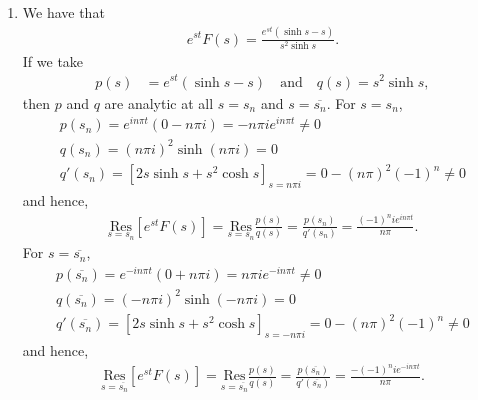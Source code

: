 \documentclass[a4paper,12pt]{article}
\begin{document}
\begin{enumerate}
\begin{enumerate}
            \item
                We have that
                \begin{align*}
                    e^{st} F(s) = \frac{e^{st}(\sinh s - s)}{s^2 \sinh s}.
                \end{align*}
                If we take
                \begin{align*}
                    p(s) &= e^{st}(\sinh s - s) \quad \text{and} \quad
                    q(s) = s^2 \sinh s,
                \end{align*}
                then $p$ and $q$ are analytic at all $s = s_n$ and $s = \overline{s_n}$. For $s = s_n$,
                \begin{gather*}
                    p(s_n) = e^{in\pi t}(0 - n\pi i) = -n\pi i e^{in\pi t} \neq 0 \\
                    q(s_n) = (n\pi i)^2 \sinh(n\pi i) = 0 \\
                    q'(s_n) = [2s \sinh s + s^2 \cosh s]_{s = n\pi i} = 0 - (n\pi)^2(-1)^n \neq 0
                \end{gather*}
                and hence,
                \begin{align*}
                    \underset{s = s_n}{\text{Res}} \left[ e^{st} F(s) \right] = \underset{s = s_n}{\text{Res}} \frac{p(s)}{q(s)} = \frac{p(s_n)}{q'(s_n)} = \frac{(-1)^n ie^{in\pi t}}{n\pi}.
                \end{align*}
                For $s = \overline{s_n}$,
                \begin{gather*}
                    p(\overline{s_n}) = e^{-in\pi t}(0 + n\pi i) = n\pi i e^{-in\pi t} \neq 0 \\
                    q(\overline{s_n}) = (-n\pi i)^2 \sinh(-n\pi i) = 0 \\
                    q'(\overline{s_n}) = [2s \sinh s + s^2 \cosh s]_{s = -n\pi i} = 0 - (n\pi)^2(-1)^n \neq 0
                \end{gather*}
                and hence,
                \begin{align*}
                    \underset{s = \overline{s_n}}{\text{Res}} \left[ e^{st} F(s) \right] = \underset{s = \overline{s_n}}{\text{Res}} \frac{p(s)}{q(s)} = \frac{p(\overline{s_n})}{q'(\overline{s_n})} = \frac{-(-1)^n ie^{-in\pi t}}{n\pi}.
                \end{align*}


\end{enumerate}
\end{enumerate}
\end{document}
